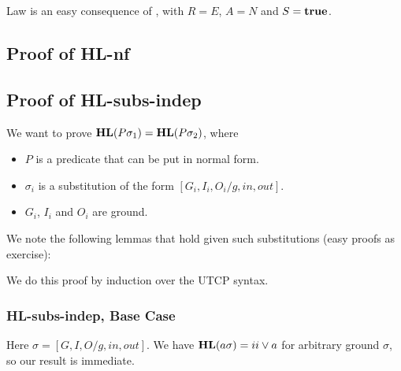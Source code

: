 Law  is an easy consequence of ,
with $R=E$, $A=N$ and $S=\mathbf{true}$.

\subsection{Proof of \textsf{HL-nf}}



\subsection{Proof of \textsf{HL-subs-indep}}

We want to prove $\mathbf{HL}(P\sigma_1)=\mathbf{HL}(P\sigma_2)$, where
\begin{itemize}
  \item $P$ is a predicate that can be put in normal form.
  \item $\sigma_i$ is a substitution of the form $[G_i,I_i,O_i/g,in,out]$.
  \item $G_i$, $I_i$ and $O_i$ are ground.
\end{itemize}
We note the following lemmas that hold given such substitutions
(easy proofs as exercise):

We do this proof by induction over the UTCP syntax.

\subsubsection{\textsf{HL-subs-indep}, Base Case}

Here $\sigma=[G,I,O/g,in,out]$.
We have $\mathbf{HL}(a\sigma) = ii \lor a$ for arbitrary ground $\sigma$,
so our result is immediate.

